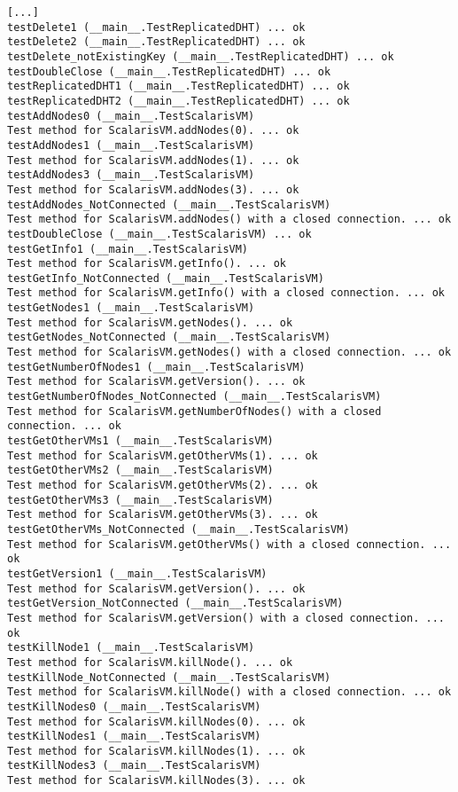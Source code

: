 \begin{lstlisting}[language={}]
%> make python-test
[...]
testDelete1 (__main__.TestReplicatedDHT) ... ok
testDelete2 (__main__.TestReplicatedDHT) ... ok
testDelete_notExistingKey (__main__.TestReplicatedDHT) ... ok
testDoubleClose (__main__.TestReplicatedDHT) ... ok
testReplicatedDHT1 (__main__.TestReplicatedDHT) ... ok
testReplicatedDHT2 (__main__.TestReplicatedDHT) ... ok
testAddNodes0 (__main__.TestScalarisVM)
Test method for ScalarisVM.addNodes(0). ... ok
testAddNodes1 (__main__.TestScalarisVM)
Test method for ScalarisVM.addNodes(1). ... ok
testAddNodes3 (__main__.TestScalarisVM)
Test method for ScalarisVM.addNodes(3). ... ok
testAddNodes_NotConnected (__main__.TestScalarisVM)
Test method for ScalarisVM.addNodes() with a closed connection. ... ok
testDoubleClose (__main__.TestScalarisVM) ... ok
testGetInfo1 (__main__.TestScalarisVM)
Test method for ScalarisVM.getInfo(). ... ok
testGetInfo_NotConnected (__main__.TestScalarisVM)
Test method for ScalarisVM.getInfo() with a closed connection. ... ok
testGetNodes1 (__main__.TestScalarisVM)
Test method for ScalarisVM.getNodes(). ... ok
testGetNodes_NotConnected (__main__.TestScalarisVM)
Test method for ScalarisVM.getNodes() with a closed connection. ... ok
testGetNumberOfNodes1 (__main__.TestScalarisVM)
Test method for ScalarisVM.getVersion(). ... ok
testGetNumberOfNodes_NotConnected (__main__.TestScalarisVM)
Test method for ScalarisVM.getNumberOfNodes() with a closed connection. ... ok
testGetOtherVMs1 (__main__.TestScalarisVM)
Test method for ScalarisVM.getOtherVMs(1). ... ok
testGetOtherVMs2 (__main__.TestScalarisVM)
Test method for ScalarisVM.getOtherVMs(2). ... ok
testGetOtherVMs3 (__main__.TestScalarisVM)
Test method for ScalarisVM.getOtherVMs(3). ... ok
testGetOtherVMs_NotConnected (__main__.TestScalarisVM)
Test method for ScalarisVM.getOtherVMs() with a closed connection. ... ok
testGetVersion1 (__main__.TestScalarisVM)
Test method for ScalarisVM.getVersion(). ... ok
testGetVersion_NotConnected (__main__.TestScalarisVM)
Test method for ScalarisVM.getVersion() with a closed connection. ... ok
testKillNode1 (__main__.TestScalarisVM)
Test method for ScalarisVM.killNode(). ... ok
testKillNode_NotConnected (__main__.TestScalarisVM)
Test method for ScalarisVM.killNode() with a closed connection. ... ok
testKillNodes0 (__main__.TestScalarisVM)
Test method for ScalarisVM.killNodes(0). ... ok
testKillNodes1 (__main__.TestScalarisVM)
Test method for ScalarisVM.killNodes(1). ... ok
testKillNodes3 (__main__.TestScalarisVM)
Test method for ScalarisVM.killNodes(3). ... ok

\end{lstlisting}
